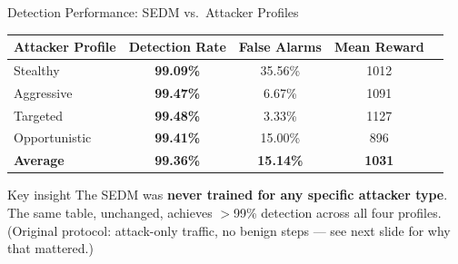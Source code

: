 \documentclass[aspectratio=169, 12pt]{beamer}
\begin{document}
\begin{frame}{Detection Performance: SEDM vs.\ Attacker Profiles}
  \begin{table}
    \centering
    \begin{tabular}{lcccc}
      \toprule
      \textbf{Attacker Profile} & \textbf{Detection Rate} & \textbf{False Alarms} & \textbf{Mean Reward} \\
      \midrule
      Stealthy      & \textbf{99.09\%} & 35.56\% & 1012 \\
      Aggressive    & \textbf{99.47\%} & 6.67\%  & 1091 \\
      Targeted      & \textbf{99.48\%} & 3.33\%  & 1127 \\
      Opportunistic & \textbf{99.41\%} & 15.00\% & 896  \\
      \midrule
      \textbf{Average} & \textbf{99.36\%} & \textbf{15.14\%} & \textbf{1031} \\
      \bottomrule
    \end{tabular}
  \end{table}
  \vspace{0.3cm}
  \begin{block}{Key insight}
    The SEDM was \textbf{never trained for any specific attacker type}.
    The same table, unchanged, achieves $>$99\% detection across all four
    profiles. \small (Original protocol: attack-only traffic, no benign
    steps --- see next slide for why that mattered.)
  \end{block}
\end{frame}
\end{document}
